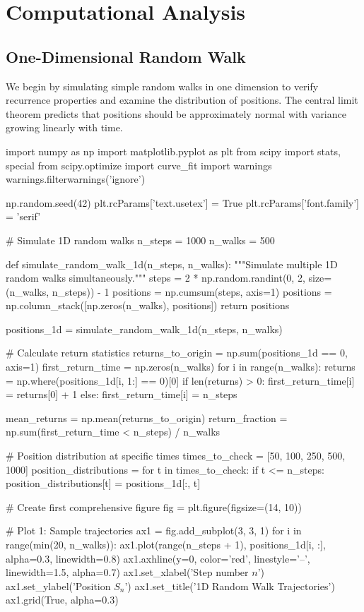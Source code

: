 \documentclass[a4paper, 11pt]{article}
\begin{document}
\section{Computational Analysis}

\subsection{One-Dimensional Random Walk}

We begin by simulating simple random walks in one dimension to verify recurrence properties and
examine the distribution of positions. The central limit theorem predicts that positions should be
approximately normal with variance growing linearly with time.

\begin{pycode}
import numpy as np
import matplotlib.pyplot as plt
from scipy import stats, special
from scipy.optimize import curve_fit
import warnings
warnings.filterwarnings('ignore')

np.random.seed(42)
plt.rcParams['text.usetex'] = True
plt.rcParams['font.family'] = 'serif'

# Simulate 1D random walks
n_steps = 1000
n_walks = 500

def simulate_random_walk_1d(n_steps, n_walks):
    """Simulate multiple 1D random walks simultaneously."""
    steps = 2 * np.random.randint(0, 2, size=(n_walks, n_steps)) - 1
    positions = np.cumsum(steps, axis=1)
    positions = np.column_stack([np.zeros(n_walks), positions])
    return positions

positions_1d = simulate_random_walk_1d(n_steps, n_walks)

# Calculate return statistics
returns_to_origin = np.sum(positions_1d == 0, axis=1)
first_return_time = np.zeros(n_walks)
for i in range(n_walks):
    returns = np.where(positions_1d[i, 1:] == 0)[0]
    if len(returns) > 0:
        first_return_time[i] = returns[0] + 1
    else:
        first_return_time[i] = n_steps

mean_returns = np.mean(returns_to_origin)
return_fraction = np.sum(first_return_time < n_steps) / n_walks

# Position distribution at specific times
times_to_check = [50, 100, 250, 500, 1000]
position_distributions = {}
for t in times_to_check:
    if t <= n_steps:
        position_distributions[t] = positions_1d[:, t]

# Create first comprehensive figure
fig = plt.figure(figsize=(14, 10))

# Plot 1: Sample trajectories
ax1 = fig.add_subplot(3, 3, 1)
for i in range(min(20, n_walks)):
    ax1.plot(range(n_steps + 1), positions_1d[i, :], alpha=0.3, linewidth=0.8)
ax1.axhline(y=0, color='red', linestyle='--', linewidth=1.5, alpha=0.7)
ax1.set_xlabel('Step number $n$')
ax1.set_ylabel('Position $S_n$')
ax1.set_title('1D Random Walk Trajectories')
ax1.grid(True, alpha=0.3)


\end{pycode}
\end{document}
